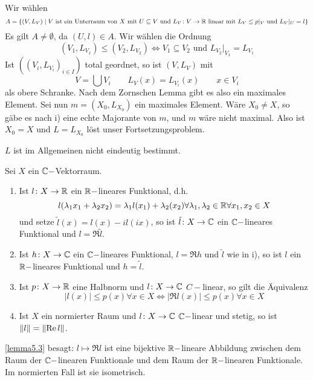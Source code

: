 \begin{beweis}
\begin{enumerate}
		Wir w\"ahlen
		\[ A=\lbrace (V,L_V)\mid V\text{ ist ein Unterraum von }X\text{ mit }U\subseteq V\text{ und }L_V\colon V\rightarrow\mathbb{R}\text{ linear mit }L_V\leq p|_V\text{ und }L_V|_U=l\rbrace \]
		Es gilt $ A\neq\emptyset $, da $ (U,l)\in A $. Wir w\"ahlen die Ordnung
		\[ (V_1,L_{V_1})\leq(V_2,L_{V_2})\Leftrightarrow V_1\subseteq V_2\text{ und }L_{V_2}|_{V_1}=L_{V_1} \]
		Ist $ ((V_i,L_{V_i})_{i\in I}) $ total geordnet, so ist $ (V,L_V) $ mit
		\[ V=\bigcup V_i\qquad L_V(x)=L_{V_i}(x)\qquad x\in V_i \] 
		als obere Schranke. Nach dem Zornschen Lemma gibt es also ein maximales Element. Sei nun $ m=(X_0,L_{X_0}) $ ein maximales Element. W\"are $ X_0\neq X $, so g\"abe es nach i) eine echte Majorante von $ m $, und $ m $ w\"are nicht maximal. Also ist $ X_0=X $ und $ L=L_{X_0} $ l\"ost unser Fortsetzungsproblem.
	\end{enumerate}
\end{beweis}
\begin{bemerkung*}
	$ L $ ist im Allgemeinen nicht eindeutig bestimmt.
\end{bemerkung*}
\begin{lemma}
	Sei $ X $ ein $ \mathbb{C}- $Vektorraum.
	\begin{enumerate}
		\item Ist $ l\colon X\rightarrow\mathbb{R} $ ein $ \mathbb{R}- $lineares Funktional, d.h.
		\[ l(\lambda_1 x_1+\lambda_2 x_2)=\lambda_1 l(x_1)+\lambda_2(x_2)\forall\lambda_1,\lambda_2\in\mathbb{R}\forall x_1,x_2\in X \] und setze $ \tilde l(x)=l(x)-il(ix) $, so ist $ \tilde l\colon X\rightarrow\mathbb{C} $ ein $ \mathbb{C}- $lineares Funktional und $ l=\Re\tilde l $.
		\item Ist $ h\colon X\rightarrow\mathbb{C} $ ein $ \mathbb{C}- $lineares Funktional, $ l=\Re h $ und $ \tilde l $ wie in i), so ist $ l $ ein $ \mathbb{R}- $lineares Funktional und $ h=\tilde l $.
		\item Ist $ p\colon X\rightarrow\mathbb{R} $ eine Halbnorm und $ l\colon X\rightarrow\mathbb{C} $ $ C- $linear, so gilt die \"Aquivalenz
		\[ |l(x)|\leq p(x)\forall x\in X\Leftrightarrow|\Re l(x)|\leq p(x)\forall x\in X \]
		\item Ist $ X $ ein normierter Raum und $ l\colon X\rightarrow\mathbb{C} $ $ \mathbb{C}- $linear und stetig, so ist $ \left\|l\right\|=\left\|\operatorname{Re} l\right\| $.
	\end{enumerate}
\end{lemma}
\newpage
\begin{bemerkung*}
	\ref{lemma5.3} besagt: $ l\mapsto\Re l $ ist eine bijektive $ \mathbb{R}- $lineare Abbildung zwischen dem Raum der $ \mathbb{C}- $linearen Funktionale und dem Raum der $ \mathbb{R}- $linearen Funktionale. Im normierten Fall ist sie isometrisch.
\end{bemerkung*}
